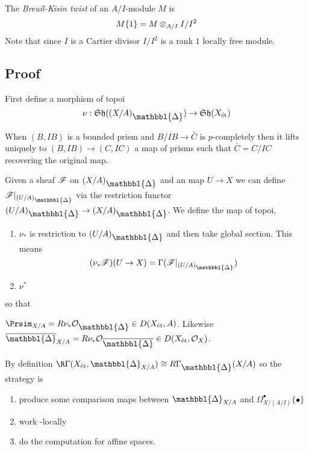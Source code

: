 \documentclass[12pt]{article}
\newcommand{\Prism}{{\mathlarger{\mathbbl{\Delta}}}}
\begin{document}
\begin{defn}
The \textit{Breuil-Kisin twist} of an $A / I$-module $M$ is 
\[ M \{ 1 \} = M \otimes_{A/I} I / I^2 \]
Note that since $I$ is a Cartier divisor $I / I^2$ is a rank $1$ locally free module. 
\end{defn}

\subsection{Proof}

First define a morphism of topoi
\[ \nu : \Sh((X/A)_{\Prism}) \to \Sh(X_{\et}) \]

\begin{lemma}[BS, 2.18]
When $(B, IB)$ is a bounded prism and $B/IB \to \bar{C}$ is $p$-completely \etale then it lifts uniquely to $(B, IB) \to (C, IC)$ a map of prisms such that $\bar{C} = C/IC$ recovering the original map.
\end{lemma}

Given a sheaf $\mathscr{F}$ on $(X/A)_{\Prism}$ and an \etale map $U \to X$ we can define $\F|_{(U/A)_{\Prism}}$ via the restriction functor $(U/A)_{\Prism} \to (X/A)_{\Prism}$. We define the map of topoi,
\begin{enumerate}
\item $\nu_*$ is restriction to $(U/A)_{\Prism}$ and then take global section. This means
\[ (\nu_* \F)(U \to X) = \Gamma(\F|_{(U/A)_{\Prism}}) \]
\item $\nu^*$ 
\end{enumerate}


so that
\begin{center}
\end{center}

\begin{defn}
$\Prsim_{X/A} = R \nu_* \struct{\Prism} \in D(X_{\et}, A)$. Likewise $\ol{\Prism}_{X/A} = R \nu_* \struct{\ol{\Prism}} \in D(X_{\et}, \struct{X})$. 
\end{defn}

By definition $\R \Gamma(X_{\et}, \Prism_{X/A}) \cong R \Gamma_{\Prism}(X/A)$ so the strategy is
\begin{enumerate}
\item produce some comparison maps between $\Prism_{X/A}$ and $\Omega^\bullet_{X/(A/I)} \{ \bullet \}$
\item work \etale-locally
\item do the computation for affine spaces.
\end{enumerate}
\end{document}
